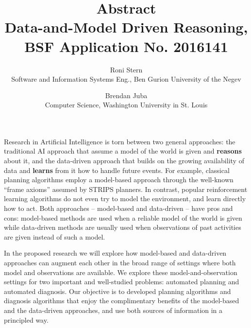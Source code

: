 \documentclass[12pt]{article}
\begin{document}
\title{Abstract \\ \Large{Data-and-Model Driven Reasoning, BSF Application No. 2016141}}
\date{\vspace{-0.5cm}}
\author{Roni Stern \\ Software and Information Systems Eng., Ben Gurion University of the Negev
        \and Brendan Juba \\ Computer Science, Washington University in St. Louis}
\maketitle

Research in Artificial Intelligence is torn between two general approaches: the traditional AI approach that assume a model of the world is given and {\bf reasons} about it, and the data-driven  approach that builds on the growing availability of data and {\bf learns} from it how to handle future events. For example, classical planning algorithms 
employ a model-based approach through the well-known ``frame axioms'' assumed by STRIPS planners. In contrast, popular reinforcement learning algorithms do not even try to model the environment, and learn directly how to act. Both approaches -- model-based and data-driven -- have pros and cons: model-based methods are used when a reliable model of the world is given while 
data-driven methods are usually used when observations of past activities are given instead of such a model. %





In the proposed research we will explore how model-based and data-driven approaches can augment each other in the broad range of settings where both model and observations are available. We explore these model-and-observation settings for two important and well-studied problems: automated planning and automated diagnosis. 
Our objective is to developed planning algorithms and diagnosis algorithms that enjoy the complimentary benefits of the model-based and the data-driven approaches, and use both sources of information in a principled way. 
\end{document}
